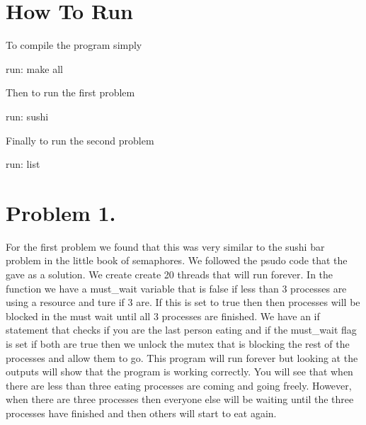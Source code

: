 \documentclass[letterpaper,10pt,titlepage]{article}
\begin{document}
\section{How To Run} To compile the program simply 

run: make all

Then to run the first problem 

run: sushi

Finally to run the second problem 

run: list

\section{Problem 1.} For the first problem we found that this was very similar 
to the sushi bar problem in the little book of semaphores. We followed the 
psudo code that the gave as a solution. We create create 20 threads that will 
run forever. In the function we have a must\_wait variable that is false if 
less than 3 processes are using a resource and ture if 3 are. If this is set to 
true then then processes will be blocked in the must wait until all 3 processes 
are finished. We have an if statement that checks if you are the last person 
eating and if the must\_wait flag is set if both are true then we unlock the 
mutex that is blocking the rest of the processes and allow them to go. This 
program will run forever but looking at the outputs will show that the 
program is working correctly. You will see that when there are less than 
three eating processes are coming and going freely. However, when there 
are three processes then everyone else will be waiting until the three 
processes have finished and then others will start to eat again.
\end{document}
